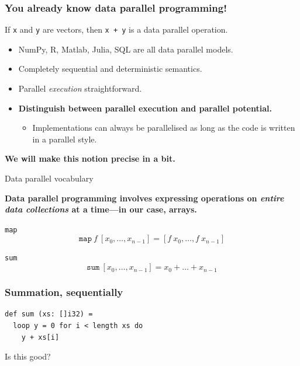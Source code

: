 \begin{frame}
  \frametitle{You already know data parallel programming!}

  \pause\bigskip

  If \texttt{x} and \texttt{y} are vectors, then \texttt{x + y} is a
  data parallel operation.

  \pause\bigskip

  \begin{itemize}
  \item NumPy, R, Matlab, Julia, SQL are all data parallel models.
  \item Completely sequential and deterministic semantics.
  \item Parallel \textit{execution} straightforward.
  \item \textbf{Distinguish between parallel execution and parallel potential.}
    \begin{itemize}
    \item Implementations can always be parallelised as long as the
      code is written in a parallel style.
    \end{itemize}
  \end{itemize}

  \textbf{We will make this notion precise in a bit.}
\end{frame}

\begin{frame}{Data parallel vocabulary}

  \textbf{Data parallel programming involves expressing operations on
    \emph{entire data collections} at a time---in our case, arrays.}

  \begin{block}{\texttt{map}}
    \[
      \texttt{map}~f~[x_{0}, \ldots, x_{n-1}] = [f~x_{0}, \ldots, f~x_{n-1}]
    \]
  \end{block}

  \begin{block}{\texttt{sum}}
    \[
      \texttt{sum}~[x_{0}, \ldots, x_{n-1}] = x_{0} + \ldots + x_{n-1}
    \]
  \end{block}
\end{frame}

\begin{frame}[fragile]
  \frametitle{Summation, sequentially}

\begin{lstlisting}
def sum (xs: []i32) =
  loop y = 0 for i < length xs do
    y + xs[i]
\end{lstlisting}

  Is this good?

\end{frame}

